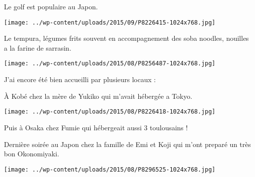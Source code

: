 \pagebreak
 Le golf est populaire au Japon.
\begin{center} \texttt{[image: ../wp-content/uploads/2015/09/P8226415-1024x768.jpg]} \end{center}

 Le tempura, légumes frits souvent en accompagnement des soba noodles, nouilles a la farine de sarrasin. 
\begin{center} \texttt{[image: ../wp-content/uploads/2015/08/P8256487-1024x768.jpg]} \end{center}

\pagebreak
 J'ai encore été bien accueilli par plusieurs locaux :

 \`A Kobé chez la mère de Yukiko qui m'avait hébergée a Tokyo.
\begin{center} \texttt{[image: ../wp-content/uploads/2015/08/P8226418-1024x768.jpg]} \end{center}

 Puis à Osaka chez Fumie qui hébergeait aussi 3 toulousains ! 

 Dernière soirée au Japon chez la famille de Emi et Koji qui m'ont preparé un très bon Okonomiyaki.
\begin{center} \texttt{[image: ../wp-content/uploads/2015/08/P8296525-1024x768.jpg]} \end{center}